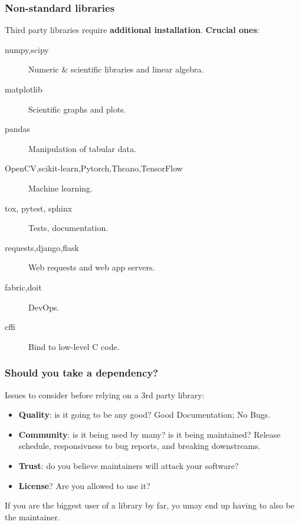 \documentclass{beamer} %
\newcommand\emc[1]{\textcolor{brightblue}{\textbf{#1}}}
\begin{document}
\begin{frame}

\frametitle{Non-standard libraries}

Third party libraries require \emc{additional installation}. \emc{Crucial ones}:
\begin{description}
  \item[numpy,scipy] Numeric \& scientific libraries and linear algebra.
  \item[matplotlib] Scientific graphs and plots.
  \item[pandas] Manipulation of tabular data.
  \item[OpenCV,scikit-learn,Pytorch,Theano,TensorFlow] Machine learning.
  \item[tox, pytest, sphinx] Tests, documentation.
  \item[requests,django,flask] Web requests and web app servers.
  \item[fabric,doit] DevOps.
  \item[cffi] Bind to low-level C code.
\end{description}

\end{frame}


\begin{frame}

\frametitle{Should you take a dependency?}

Issues to consider before relying on a 3rd party library:
\begin{itemize}
\item \emc{Quality}: is it going to be any good? Good Documentation; No Bugs.
\item \emc{Community}: is it being used by many? is it being maintained? Release schedule, responsivness to bug reports, and breaking downstreams.
\item \emc{Trust}: do you believe maintainers will attack your software?
\item \emc{License}? Are you allowed to use it?
\end{itemize}

\begin{block}{}
If you are the biggest user of a library by far, yo umay end up having to also be the maintainer.
\end{block}

\end{frame}
\end{document}
